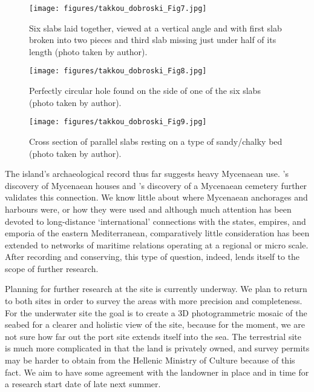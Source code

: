 \begin{figure}[!p]
	\texttt{[image: figures/takkou\_dobroski\_Fig7.jpg]}
	\centering
	\caption{Six slabs laid together, viewed at a vertical angle and with first slab broken into two pieces and third slab missing just under half of its length (photo taken by author).}
	\label{fig:Takkou_Fig7}

	\texttt{[image: figures/takkou\_dobroski\_Fig8.jpg]}
	\centering
	\caption{Perfectly circular hole found on the side of one of the six slabs (photo taken by author).}
	\label{fig:Takkou_Fig8}
\end{figure}

\begin{figure}[!htb]
	\texttt{[image: figures/takkou\_dobroski\_Fig9.jpg]}
	\centering
	\caption{Cross section of parallel slabs resting on a type of sandy/chalky bed (photo taken by author).}
	\label{fig:Takkou_Fig9}
\end{figure}


\noindent The island’s archaeological record thus far suggests heavy Mycenaean use. \textcite{Benton_1933}'s discovery of Mycenaean houses and \textcite{Agallopoulou_1973}'s discovery of a Mycenaean cemetery further validates this connection. We know little about where Mycenaean anchorages and harbours were, or how they were used \parencite[1]{Tartaron_2013} and although much attention has been devoted to long-distance ‘international’ connections with the states, empires, and emporia of the eastern Mediterranean, comparatively little consideration has been extended to networks of maritime relations operating at a regional or micro scale. After recording and conserving, this type of question, indeed, lends itself to the scope of further research.

Planning for further research at the site is currently underway. We plan to return to both sites in order to survey the areas with more precision and completeness. For the underwater site the goal is to create a 3D photogrammetric mosaic of the seabed for a clearer and holistic view of the site, because for the moment, we are not sure how far out the port site extends itself into the sea. The terrestrial site is much more complicated in that the land is privately owned, and survey permits may be harder to obtain from the Hellenic Ministry of Culture because of this fact. We aim to have some agreement with the landowner in place and in time for a research start date of late next summer. 

